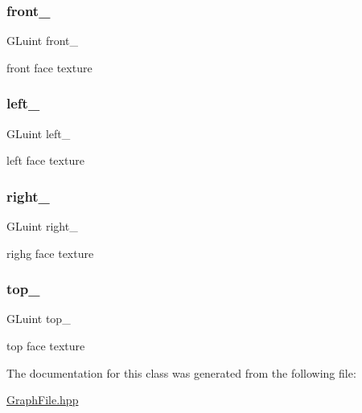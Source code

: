 \subsubsection{\texorpdfstring{front\+\_\+}{front\_}}
{\footnotesize\ttfamily G\+Luint front\+\_\+\hspace{0.3cm}{\ttfamily [private]}}



front face texture 

\mbox{\label{classSkinBox__t_a0c5a8370ea6676f59c6d49a68bfa3ce2}} 
\subsubsection{\texorpdfstring{left\+\_\+}{left\_}}
{\footnotesize\ttfamily G\+Luint left\+\_\+\hspace{0.3cm}{\ttfamily [private]}}



left face texture 

\mbox{\label{classSkinBox__t_af4fe3372619e9a7e49d4495b332dbe8e}} 
\subsubsection{\texorpdfstring{right\+\_\+}{right\_}}
{\footnotesize\ttfamily G\+Luint right\+\_\+\hspace{0.3cm}{\ttfamily [private]}}



righg face texture 

\mbox{\label{classSkinBox__t_a2660ed9c1a6e662b697ea23a3710248d}} 
\subsubsection{\texorpdfstring{top\+\_\+}{top\_}}
{\footnotesize\ttfamily G\+Luint top\+\_\+\hspace{0.3cm}{\ttfamily [private]}}



top face texture 



The documentation for this class was generated from the following file\+:\begin{DoxyCompactItemize}
\item 
\hyperlink{GraphFile_8hpp}{Graph\+File.\+hpp}\end{DoxyCompactItemize}

